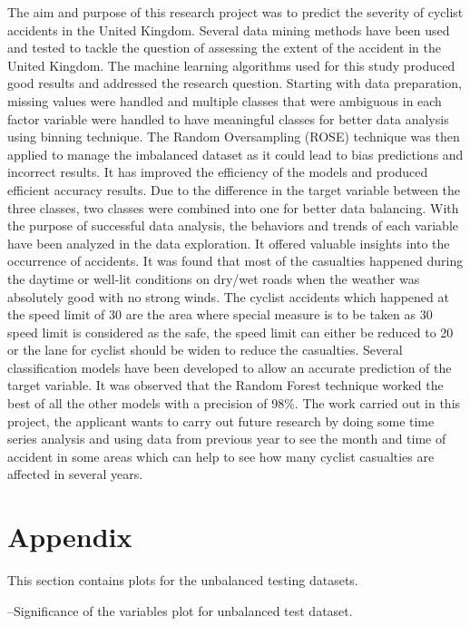 \documentclass[
  a4paper,
]{article}
\begin{document}
The aim and purpose of this research project was to predict the severity
of cyclist accidents in the United Kingdom. Several data mining methods
have been used and tested to tackle the question of assessing the extent
of the accident in the United Kingdom. The machine learning algorithms
used for this study produced good results and addressed the research
question. Starting with data preparation, missing values were handled
and multiple classes that were ambiguous in each factor variable were
handled to have meaningful classes for better data analysis using
binning technique. The Random Oversampling (ROSE) technique was then
applied to manage the imbalanced dataset as it could lead to bias
predictions and incorrect results. It has improved the efficiency of the
models and produced efficient accuracy results. Due to the difference in
the target variable between the three classes, two classes were combined
into one for better data balancing. With the purpose of successful data
analysis, the behaviors and trends of each variable have been analyzed
in the data exploration. It offered valuable insights into the
occurrence of accidents. It was found that most of the casualties
happened during the daytime or well-lit conditions on dry/wet roads when
the weather was absolutely good with no strong winds. The cyclist
accidents which happened at the speed limit of 30 are the area where
special measure is to be taken as 30 speed limit is considered as the
safe, the speed limit can either be reduced to 20 or the lane for
cyclist should be widen to reduce the casualties. Several classification
models have been developed to allow an accurate prediction of the target
variable. It was observed that the Random Forest technique worked the
best of all the other models with a precision of 98\%. The work carried
out in this project, the applicant wants to carry out future research by
doing some time series analysis and using data from previous year to see
the month and time of accident in some areas which can help to see how
many cyclist casualties are affected in several years.

\newpage
\appendix
\section{Appendix}

This section contains plots for the unbalanced testing datasets.

--Significance of the variables plot for unbalanced test dataset.
\end{document}
